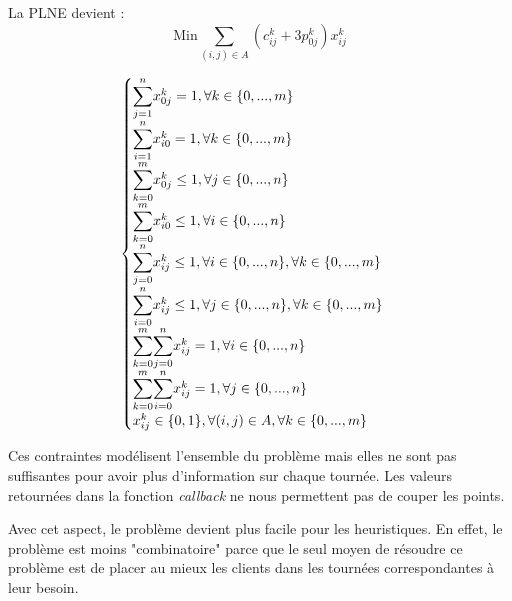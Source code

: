 La PLNE devient :
\[\text{Min} \sum_{(i, j) \in A} (c^k_{ij} + 3p^k_{0j})x^k_{ij}\]

\[\begin{cases}
{\mathlarger\sum_{j=1}^{n}} x^k_{0j} = 1, \forall k \in \{0, ..., m\} \\
{\mathlarger\sum_{i=1}^{n}} x^k_{i0} = 1, \forall k \in \{0, ..., m\} \\
{\mathlarger\sum_{k=0}^{m}} x^k_{0j} \leq 1, \forall j \in \{0, ..., n\}\\
{\mathlarger\sum_{k=0}^{m}} x^k_{i0} \leq 1, \forall i \in \{0, ..., n\}\\
{\mathlarger\sum_{j=0}^{n}} x^k_{ij} \leq 1, \forall i \in \{0, ..., n\}, \forall k \in \{0, ..., m\}\\
{\mathlarger\sum_{i=0}^{n}} x^k_{ij} \leq 1, \forall j \in \{0, ..., n\}, \forall k \in \{0, ..., m\}\\
{\mathlarger\sum_{k=0}^{m}}{\mathlarger\sum_{j=0}^{n}} x^k_{ij} = 1, \forall i \in \{0, ..., n\}\\
{\mathlarger\sum_{k=0}^{m}}{\mathlarger\sum_{i=0}^{n}} x^k_{ij} = 1, \forall j \in \{0, ..., n\}\\
x^k_{ij} \in \{0,1\}, \forall (i, j) \in A, \forall k \in \{0, ..., m\}
\end{cases}\]

Ces contraintes modélisent l'ensemble du problème mais elles ne sont pas suffisantes pour avoir plus d'information sur chaque tournée. Les valeurs retournées dans la fonction \textit{callback} ne nous permettent pas de couper les points.

Avec cet aspect, le problème devient plus facile pour les heuristiques. En effet, le problème est moins "combinatoire" parce que le seul moyen de résoudre ce problème est de placer au mieux les clients dans les tournées correspondantes à leur besoin.
